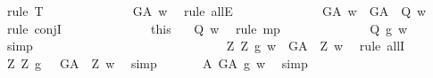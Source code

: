 \begin{isabellebody}
\ {\isacharparenleft}rule\ T{}{\isacharparenright}\isanewline
\ \ \ \ \ \ \ \ \ \ \ \isamarkupfalse%
\ {\isachardoublequoteopen}{\isasymP}\ G\isactrlsup A\ w{\isachardoublequoteclose}\ \isamarkupfalse%
\ {\isacharparenleft}rule\ allE{\isacharparenright}\isanewline
\ \ \ \ \ \ \ \ \ \ \ \isamarkupfalse%
\ {\isachardoublequoteopen}{\isasymP}\ G\isactrlsup A\ w\ {\isasymand}\ {\isacharparenleft}G\isactrlsup A\ {\isasymRrightarrow}\ Q{\isacharparenright}\ w{\isachardoublequoteclose}\ \isamarkupfalse%
\ {}\ \isamarkupfalse%
\ {\isacharparenleft}rule\ conjI{\isacharparenright}\isanewline
\ \ \ \ \ \ \ \ \ \ \ \isamarkupfalse%
\ {}\ this\ \isamarkupfalse%
\ {\isachardoublequoteopen}{\isasymP}\ Q\ w{\isachardoublequoteclose}\ \isamarkupfalse%
\ {\isacharparenleft}rule\ mp{\isacharparenright}\ %
\isanewline
\ \ \ \ \ \ \ \ \ \ \ \isamarkupfalse%
\ {\isachardoublequoteopen}{\isacharparenleft}\isactrlbold {\isasymbox}{\isacharparenleft}Q\ g{\isacharparenright}{\isacharparenright}\ w{\isachardoublequoteclose}\ \isamarkupfalse%
\ {}\ \isamarkupfalse%
\ simp\ \isanewline
\ \ \ \ \ \ \ \ \ \isamarkupfalse%
\ \ \ \ \isanewline
\ \ \ \ \ \isacommand{{\isacharbraceright}}\isamarkupfalse%
\ \isanewline
\ \ \ \ \ \isamarkupfalse%
\ \ {\isachardoublequoteopen}{\isasymforall}Z{\isachardot}\ {\isacharparenleft}\isactrlbold {\isasymbox}{\isacharparenleft}Z\ g{\isacharparenright}{\isacharparenright}\ w\ {\isasymlongleftrightarrow}\ {\isacharparenleft}G\isactrlsup A\ {\isasymRrightarrow}\ Z{\isacharparenright}\ w{\isachardoublequoteclose}\ \isamarkupfalse%
\ {\isacharparenleft}rule\ allI{\isacharparenright}\isanewline
\ \ \ \ \ \isamarkupfalse%
\ {\isachardoublequoteopen}{\isacharparenleft}\isactrlbold {\isasymforall}Z{\isachardot}\ \isactrlbold {\isasymbox}{\isacharparenleft}Z\ g{\isacharparenright}\ \isactrlbold {\isasymleftrightarrow}\ \ G\isactrlsup A\ {\isasymRrightarrow}\ Z{\isacharparenright}\ w{\isachardoublequoteclose}\ \isamarkupfalse%
\ simp\isanewline
\ \ \ \ \ \isamarkupfalse%
\ {\isachardoublequoteopen}{\isasymE}\isactrlsup A\ G\isactrlsup A\ g\ w{\isachardoublequoteclose}\ \isamarkupfalse%
\ simp\isanewline
\ \ \ \ \isacommand{{\isacharbraceright}}\isamarkupfalse%
\isanewline
\ \ \ \ \isamarkupfalse%

\end{isabellebody}

